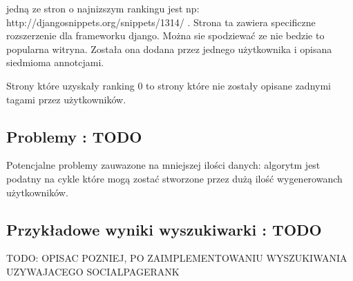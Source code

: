 jedną ze stron o najnizszym rankingu jest np: http://djangosnippets.org/snippets/1314/ . Strona ta zawiera specificzne rozszerzenie dla frameworku django. Można sie spodziewać ze nie bedzie to popularna witryna. Została ona dodana przez jednego użytkownika i opisana siedmioma annotcjami.

Strony które uzyskały ranking 0 to strony które nie zostały opisane zadnymi tagami przez użytkowników. 

\subsection{Problemy : TODO}
Potencjalne problemy zauwazone na mniejszej ilości danych: algorytm jest podatny na cykle które mogą zostać stworzone przez dużą ilość wygenerowanch użytkowników.

\subsection{Przykładowe wyniki wyszukiwarki : TODO} 

TODO: OPISAC POZNIEJ, PO ZAIMPLEMENTOWANIU WYSZUKIWANIA UZYWAJACEGO SOCIALPAGERANK 











